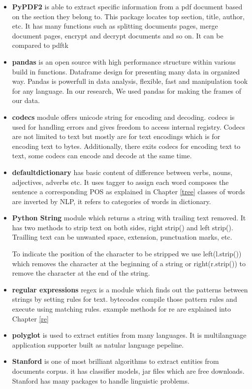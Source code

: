 \begin{itemize}
\item \textbf{PyPDF2} is able to extract specific information from a pdf document based on the section they belong to. This package locates top section, title, author, etc. It has many functions such as splitting documents pages, merge document pages, encrypt and decrypt documents and so on. It can be compared to pdftk
\item \textbf{pandas} is an open source with high performance structure within various build in functions.
Dataframe design for presenting many data in organized way. Pandas is powerfull in data analysis, flexible, fast and manipulation took for any language. In our research, We used pandas for making the frames of our data.
\item \textbf{codecs} module  offers unicode string for encoding and decoding. codecs is used for handling errors and gives freedom to access internal registry. Codecs are not limited to text but mostly are for text encodings which is for encoding text to bytes. Additionally, there exits codecs for encoding text to text, some codecs can encode and decode at the same time.
\item  \textbf{defaultdictionary} has basic content of difference between verbs, nouns, adjectives, adverbs etc. It uses tagger to assign each word composes the sentence a corresponding POS as explained in Chapter \ref{tree} classes of words are inverted by NLP, it refers to categories of words in dictionary.
\item \textbf{Python String} module which returns a string with trailing text removed.  It has two methods to strip text on both sides, right strip() and left strip(). Trailling text can be  unwanted space, extension, punctuation marks, etc.

To indicate the position of the character to be stripped we use left(l.strip()) which removes the character at the beginning of a string or right(r.strip()) to remove the character at the end of the string.
\item \textbf{regular expressions } regex is a module which finds out the patterns between strings by setting rules for text. bytecodes compile those pattern rules and execute using matching rules.  example methods for re are explained into Chapter \ref{re}
\item \textbf{polyglot} is used to extract entities from many languages.  It is multilanguage application supporter built as natular language pepeline.
\item \textbf{Stanford} is one of most brilliant algorithms to extract entities from  documents corpus. it has classifier models, jar files which are free downloads. Stanford has many packages to handle linguistic problems. 
\end{itemize}

